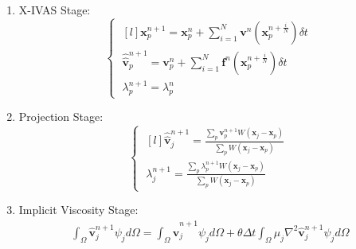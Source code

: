 \begin{program}[htbp]
	{\footnotesize
	\begin{enumerate}
	    \item X-IVAS Stage:
	    \begin{equation}
	      \left\{\;
	      \begin{matrix}[l]
		  \mathbf{x}^{n+1}_{p}=\mathbf{x}^{n}_{p}+ \sum_{i=1}^{N} \mathbf{v}^{n}(\mathbf{x}^{n+\frac{i}{N}}_{p}) \delta t \\
		  \widehat{\widehat{\mathbf{v}}}^{n+1}_{p}=\mathbf{v}^{n}_{p}+ \sum_{i=1}^{N} \mathbf{f}^{n} (\mathbf{x}^{n+\frac{i}{N}}_{p})  \delta t \\
		  \lambda_p^{n+1} =\lambda_p^n
	      \end{matrix}\;
	      \right.
	      \label{Step2step2fluids}
	    \end{equation}
	    \item Projection Stage:
	    \begin{equation}\label{Step3b2fluids}
	    \left\{\;
	      \begin{matrix}[l]
	      \displaystyle \widehat{\widehat{\mathbf{v}}}^{n+1}_{j}=\frac{\sum_{p} \mathbf{v}^{n+1}_{p} W(\mathbf{x}_{j}-\mathbf{x}_{p})}{\sum_{p} W(\mathbf{x}_{j}-\mathbf{x}_{p})} \\
	      \displaystyle \lambda^{n+1}_{j}=\frac{\sum_{p} \lambda^{n+1}_{p} W(\mathbf{x}_{j}-\mathbf{x}_{p})}{\sum_{p} W(\mathbf{x}_{j}-\mathbf{x}_{p})}
	      \end{matrix}\;
	      \right.
	    \end{equation}
	    \item Implicit Viscosity Stage:
	     \begin{eqnarray}\label{Step4a2fluids}
	      \displaystyle \int_{\Omega} \widehat{\mathbf{v}}^{n+1}_{j}\psi_j d\Omega =\int_{\Omega} \widehat{\widehat{\mathbf{v}}}^{n+1}_{j}\psi_j d\Omega + \theta \Delta t \int_{\Omega} \mu_j \nabla^{2}\widehat{\mathbf{v}}^{n+1}_{j} \psi_j d\Omega
	      \end{eqnarray}


\end{enumerate}}
\end{program}
